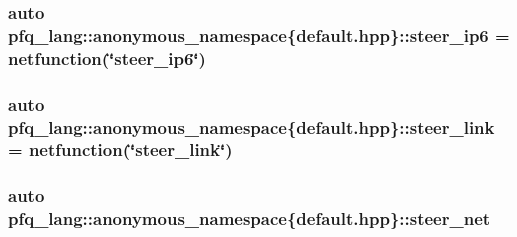 \hypertarget{namespacepfq__lang_1_1anonymous__namespace_02default_8hpp_03_a011de504f63578469615a302f823d238}{
\subsubsection[{steer\-\_\-ip6}]{\setlength{\rightskip}{0pt plus 5cm}auto pfq\-\_\-lang\-::anonymous\-\_\-namespace\{default.\-hpp\}\-::steer\-\_\-ip6 = {\bf netfunction}(\char`\"{}steer\-\_\-ip6\char`\"{})}}\label{namespacepfq__lang_1_1anonymous__namespace_02default_8hpp_03_a011de504f63578469615a302f823d238}
\hypertarget{namespacepfq__lang_1_1anonymous__namespace_02default_8hpp_03_af339132b49ec24313a1b3d33cefb1628}{
\subsubsection[{steer\-\_\-link}]{\setlength{\rightskip}{0pt plus 5cm}auto pfq\-\_\-lang\-::anonymous\-\_\-namespace\{default.\-hpp\}\-::steer\-\_\-link = {\bf netfunction}(\char`\"{}steer\-\_\-link\char`\"{})}}\label{namespacepfq__lang_1_1anonymous__namespace_02default_8hpp_03_af339132b49ec24313a1b3d33cefb1628}
\hypertarget{namespacepfq__lang_1_1anonymous__namespace_02default_8hpp_03_a2c53e95204f3841919f780940b607d68}{
\subsubsection[{steer\-\_\-net}]{\setlength{\rightskip}{0pt plus 5cm}auto pfq\-\_\-lang\-::anonymous\-\_\-namespace\{default.\-hpp\}\-::steer\-\_\-net}}\label{namespacepfq__lang_1_1anonymous__namespace_02default_8hpp_03_a2c53e95204f3841919f780940b607d68}
